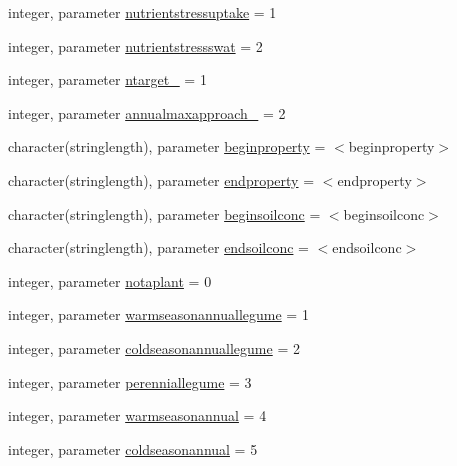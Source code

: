 \begin{DoxyCompactItemize}
\item 
integer, parameter \mbox{\hyperlink{namespacemodulevegetation_a0c5b6ced40e0ad90e60f119c725a7add}{nutrientstressuptake}} = 1
\item 
integer, parameter \mbox{\hyperlink{namespacemodulevegetation_aeae6608b85511eb5af5fe147eef4c893}{nutrientstressswat}} = 2
\item 
integer, parameter \mbox{\hyperlink{namespacemodulevegetation_aab05f943f7f926b8835fc8feda175327}{ntarget\+\_\+}} = 1
\item 
integer, parameter \mbox{\hyperlink{namespacemodulevegetation_a6c9a5abf22d1f3911992e9fe7ca54961}{annualmaxapproach\+\_\+}} = 2
\item 
character(stringlength), parameter \mbox{\hyperlink{namespacemodulevegetation_af5c39235da7ffa5b02b08e4b5bdd08e0}{beginproperty}} = \textquotesingle{}$<$beginproperty$>$\textquotesingle{}
\item 
character(stringlength), parameter \mbox{\hyperlink{namespacemodulevegetation_a73f3f232bb7f070329fd6d42320ca563}{endproperty}} = \textquotesingle{}$<$endproperty$>$\textquotesingle{}
\item 
character(stringlength), parameter \mbox{\hyperlink{namespacemodulevegetation_aac537c41b68962e791c65feb871f5cce}{beginsoilconc}} = \textquotesingle{}$<$beginsoilconc$>$\textquotesingle{}
\item 
character(stringlength), parameter \mbox{\hyperlink{namespacemodulevegetation_aae3895207aa7a807bcad1a2dbd43ffaa}{endsoilconc}} = \textquotesingle{}$<$endsoilconc$>$\textquotesingle{}
\item 
integer, parameter \mbox{\hyperlink{namespacemodulevegetation_ab82ae872dc102775656928be45fa95e7}{notaplant}} = 0
\item 
integer, parameter \mbox{\hyperlink{namespacemodulevegetation_ac51d5cc86df047d333a5cdc12fa3aac9}{warmseasonannuallegume}} = 1
\item 
integer, parameter \mbox{\hyperlink{namespacemodulevegetation_a00205bc4eb26dcc7864edb912b674069}{coldseasonannuallegume}} = 2
\item 
integer, parameter \mbox{\hyperlink{namespacemodulevegetation_a2358703148df12cce73e5316f9194016}{perenniallegume}} = 3
\item 
integer, parameter \mbox{\hyperlink{namespacemodulevegetation_a110f4ca571607af92386764b0832fd96}{warmseasonannual}} = 4
\item 
integer, parameter \mbox{\hyperlink{namespacemodulevegetation_a2d67e3996b3eaec3ed46783d415ca576}{coldseasonannual}} = 5

\end{DoxyCompactItemize}
